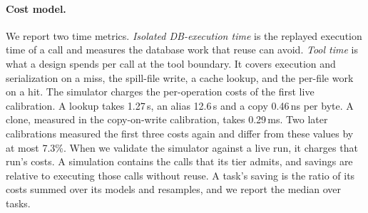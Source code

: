 \paragraph{Cost model.}
We report two time metrics. \emph{Isolated DB-execution time} is the replayed execution time of a call and measures
the database work that reuse can avoid. \emph{Tool time} is what a design spends per call at the tool boundary. It
covers execution and serialization on a miss, the spill-file write, a cache lookup, and the per-file work on a hit.
The simulator charges the per-operation costs of the first live calibration. A lookup takes 1.27\,\textmu s, an alias
12.6\,\textmu s and a copy 0.46\,ns per byte. A clone, measured in the copy-on-write calibration, takes 0.29\,ms. Two
later calibrations measured the first three costs again and differ from these values by at most 7.3\%. When we
validate the simulator against a live run, it charges that run's costs. A simulation contains the calls that its tier
admits, and savings are relative to executing those calls without reuse. A task's saving is the ratio of its costs
summed over its models and resamples, and we report the median over tasks.

